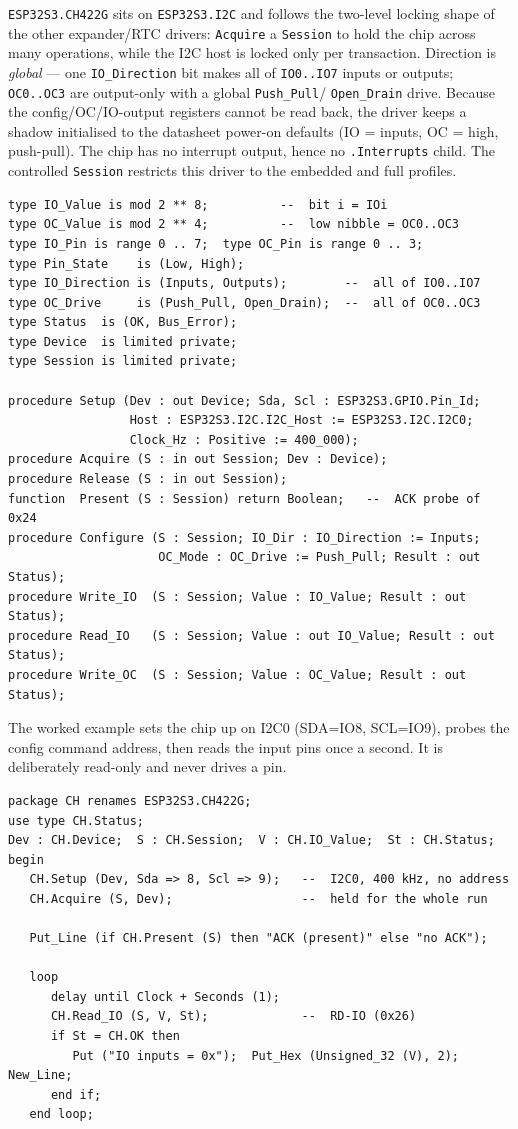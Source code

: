 \texttt{ESP32S3.CH422G} sits on \texttt{ESP32S3.I2C} and follows the two-level
locking shape of the other expander/RTC drivers: \texttt{Acquire} a
\texttt{Session} to hold the chip across many operations, while the I2C host is
locked only per transaction. Direction is \emph{global} --- one
\texttt{IO\_Direction} bit makes all of \texttt{IO0..IO7} inputs or outputs;
\texttt{OC0..OC3} are output-only with a global \texttt{Push\_Pull}/%
\texttt{Open\_Drain} drive. Because the config/OC/IO-output registers cannot be
read back, the driver keeps a shadow initialised to the datasheet power-on
defaults (IO = inputs, OC = high, push-pull). The chip has no interrupt output,
hence no \texttt{.Interrupts} child. The controlled \texttt{Session} restricts this
driver to the embedded and full profiles.

\begin{lstlisting}
type IO_Value is mod 2 ** 8;          --  bit i = IOi
type OC_Value is mod 2 ** 4;          --  low nibble = OC0..OC3
type IO_Pin is range 0 .. 7;  type OC_Pin is range 0 .. 3;
type Pin_State    is (Low, High);
type IO_Direction is (Inputs, Outputs);        --  all of IO0..IO7
type OC_Drive     is (Push_Pull, Open_Drain);  --  all of OC0..OC3
type Status  is (OK, Bus_Error);
type Device  is limited private;
type Session is limited private;

procedure Setup (Dev : out Device; Sda, Scl : ESP32S3.GPIO.Pin_Id;
                 Host : ESP32S3.I2C.I2C_Host := ESP32S3.I2C.I2C0;
                 Clock_Hz : Positive := 400_000);
procedure Acquire (S : in out Session; Dev : Device);
procedure Release (S : in out Session);
function  Present (S : Session) return Boolean;   --  ACK probe of 0x24
procedure Configure (S : Session; IO_Dir : IO_Direction := Inputs;
                     OC_Mode : OC_Drive := Push_Pull; Result : out Status);
procedure Write_IO  (S : Session; Value : IO_Value; Result : out Status);
procedure Read_IO   (S : Session; Value : out IO_Value; Result : out Status);
procedure Write_OC  (S : Session; Value : OC_Value; Result : out Status);
\end{lstlisting}

The worked example sets the chip up on I2C0 (SDA=IO8, SCL=IO9), probes the config
command address, then reads the input pins once a second. It is deliberately
read-only and never drives a pin.

\begin{lstlisting}
package CH renames ESP32S3.CH422G;
use type CH.Status;
Dev : CH.Device;  S : CH.Session;  V : CH.IO_Value;  St : CH.Status;
begin
   CH.Setup (Dev, Sda => 8, Scl => 9);   --  I2C0, 400 kHz, no address
   CH.Acquire (S, Dev);                  --  held for the whole run

   Put_Line (if CH.Present (S) then "ACK (present)" else "no ACK");

   loop
      delay until Clock + Seconds (1);
      CH.Read_IO (S, V, St);             --  RD-IO (0x26)
      if St = CH.OK then
         Put ("IO inputs = 0x");  Put_Hex (Unsigned_32 (V), 2);  New_Line;
      end if;
   end loop;
\end{lstlisting}

